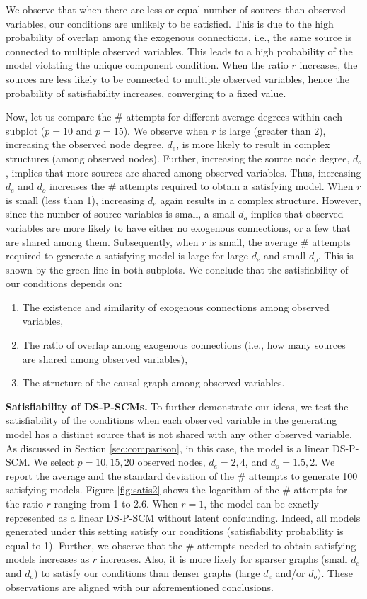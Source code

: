 \documentclass[12pt]{article}
\begin{document}
We observe that when there are less or equal number of sources than observed variables, our conditions are unlikely to be satisfied. This is due to the high probability of overlap among the exogenous connections, i.e., the same source is connected to multiple observed variables. This leads to a high probability of the model violating the unique component condition. When the ratio $r$ increases, the sources are less likely to be connected to multiple observed variables, hence the probability of satisfiability increases, converging to a fixed value. 

Now, let us compare the \# attempts for different average degrees within each subplot ($p=10$ and $p=15$). We observe when $r$ is large (greater than 2), increasing the observed node degree, $d_e$, is more likely to result in complex structures (among observed nodes). Further, increasing the source node degree, $d_o$, implies that more sources are shared among observed variables. Thus, increasing $d_e$ and $d_o$ increases the \# attempts required to obtain a satisfying model. When $r$ is small (less than 1), increasing $d_e$ again results in a complex structure. However, since the number of source variables is small, a small $d_o$ implies that observed variables are more likely to have either no exogenous connections, or a few that are shared among them. Subsequently, when $r$ is small, the average \# attempts required to generate a satisfying model is large for large $d_e$ and small $d_o$. This is shown by the green line in both subplots. We conclude that the satisfiability of our conditions depends on: 
\begin{enumerate}
\item The existence and similarity of exogenous connections among observed variables,
\item The ratio of overlap among exogenous connections (i.e., how many sources are shared among observed variables),
\item The structure of the causal graph among observed variables.
\end{enumerate}

\textbf{Satisfiability of DS-P-SCMs.}
To further demonstrate our ideas, we test the satisfiability of the conditions when each observed variable in the generating model has a distinct source that is not shared with any other observed variable. As discussed in Section \ref{sec:comparison}, in this case, the model is a linear DS-P-SCM. We select $p=10, 15, 20$ observed nodes, $d_e= 2, 4$, and $d_o= 1.5, 2$. We report the average and the standard deviation of the \# attempts to generate 100 satisfying models. Figure \ref{fig:satis2} shows the logarithm of the \# attempts for the ratio $r$ ranging from 1 to 2.6. When $r=1$, the model can be exactly represented as a linear DS-P-SCM without latent confounding. Indeed, all models generated under this setting satisfy our conditions (satisfiability probability is equal to 1). Further, we observe that the \# attempts needed to obtain satisfying models increases as $r$ increases. Also, it is more likely for sparser graphs (small $d_e$ and $d_o$) to satisfy our conditions than denser graphs (large $d_e$ and/or $d_o$). These observations are aligned with our aforementioned conclusions.
\end{document}
